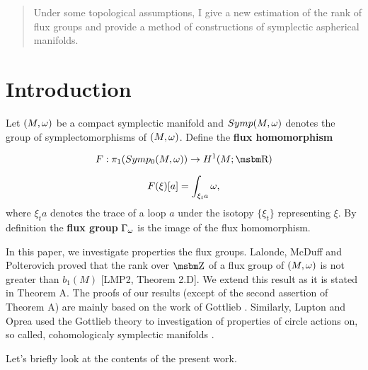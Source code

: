  

 
  \date{jkedr@math.uni.wroc.pl \\ \bigskip \today}

\maketitle

                                                                     
\begin{abstract}
    Under some topological assumptions, I give a new estimation of the rank of flux
    groups and 
    provide a method of constructions of symplectic aspherical manifolds.
 \end{abstract}




\section{Introduction} \label{S:intro}


\bigskip

Let $(M,\omega) $ be a compact symplectic manifold and $Symp(M,\omega) $ denotes
the group of symplectomorphisms of $(M,\omega) $. Define the
{\bf flux homomorphism }

$$F:\pis \to H^1(M;\B R)$$

$$F(\xi )[a]=\int _{\xi _ta}\omega,$$
where $\xi _ta$ denotes the trace of a loop $a$ under the isotopy
$\{\xi _t\}$ representing $\xi $. 
By definition the {\bf flux group } $\Gamma _{\omega }$
is the image of the flux homomorphism.

 
In this paper, we investigate properties the flux groups.
Lalonde, McDuff and Polterovich proved that the rank 
over $\B Z$ of a flux group of $(M,\omega) $ is not greater
than $b_1(M)$ [LMP2, Theorem 2.D].
We extend this result as it is stated
in Theorem A.
The proofs of our results 
(except of the second assertion of Theorem A)
are mainly based on the
work of Gottlieb \cite{go}. Similarly,
Lupton and Oprea used the Gottlieb theory to investigation
of properties of circle actions on, so called, cohomologicaly
symplectic manifolds \cite{lo}.

 
 


Let's
briefly look at the contents of the present work.


\bigskip





